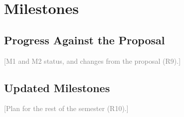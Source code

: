 \documentclass[10pt]{article}
\newcommand{\todo}[1]{\textcolor{gray}{[#1]}}
\begin{document}
\section{Milestones}

\subsection{Progress Against the Proposal}
\todo{M1 and M2 status, and changes from the proposal (R9).}

\subsection{Updated Milestones}
\todo{Plan for the rest of the semester (R10).}


\end{document}
